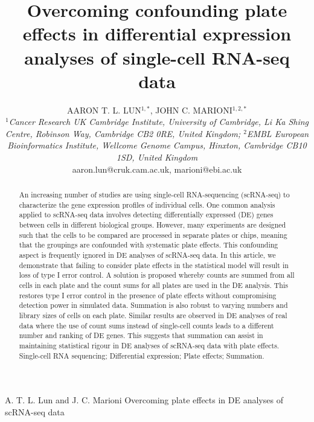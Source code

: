 \documentclass[oupdraft]{bio}
\begin{document}
\title{Overcoming confounding plate effects in differential expression analyses of single-cell RNA-seq data}

\author{AARON T. L. LUN$^{1,\ast}$, JOHN C. MARIONI$^{1,2,\ast}$ \\[4pt]
    \textit{$^1$Cancer Research UK Cambridge Institute, University of Cambridge, Li Ka Shing Centre, Robinson Way, Cambridge CB2 0RE, United Kingdom;
$^2$EMBL European Bioinformatics Institute, Wellcome Genome Campus, Hinxton, Cambridge CB10 1SD, United Kingdom}
    \\[2pt]
{aaron.lun@cruk.cam.ac.uk, marioni@ebi.ac.uk}}

\markboth%
{A. T. L. Lun and J. C. Marioni}
{Overcoming plate effects in DE analyses of scRNA-seq data}

\maketitle


\newcommand\revised[1]{\textcolor{red}{#1}}

\begin{abstract}{
An increasing number of studies are using single-cell RNA-sequencing (scRNA-seq) to characterize the gene expression profiles of individual cells.
One common analysis applied to scRNA-seq data involves detecting differentially expressed (DE) genes between cells in different biological groups.
However, many experiments are designed such that the cells to be compared are processed in separate plates or chips, 
    meaning that the groupings are confounded with systematic plate effects.
This confounding aspect is frequently ignored in DE analyses of scRNA-seq data.
In this article, we demonstrate that failing to consider plate effects in the statistical model will result in loss of type I error control.
A solution is proposed whereby counts are summed from all cells in each plate and the count sums for all plates are used in the DE analysis.
This restores type I error control in the presence of plate effects without compromising detection power in simulated data.
Summation is also robust to varying numbers and library sizes of cells on each plate.
Similar results are observed in DE analyses of real data where the use of count sums instead of single-cell counts leads to a different number and ranking of DE genes.
This suggests that summation can assist in maintaining statistical rigour in DE analyses of scRNA-seq data with plate effects.
}
{Single-cell RNA sequencing; Differential expression; Plate effects; Summation.}
\end{abstract}
\end{document}
